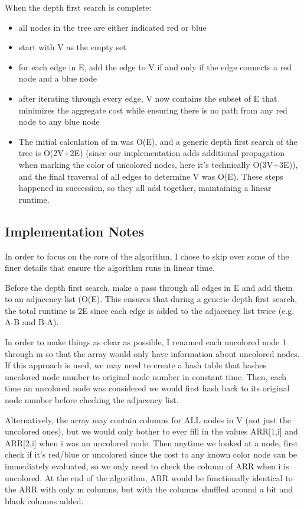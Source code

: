 \documentclass[a4paper]{article}
\begin{document}
When the depth first search is complete:
        
\begin{itemize}
    \item all nodes in the tree are either indicated red or blue
    \item start with V as the empty set
    \item for each edge in E, add the edge to V if and only if the edge connects a red node and a blue node
    \item after iterating through every edge, V now contains the subset of E that minimizes the aggregate cost while ensuring there is no path from any red node to any blue node
    \item The initial calculation of m was O(E), and a generic depth first search of the tree is O(2V+2E) (since our implementation adds additional propagation when marking the color of uncolored nodes, here it's technically O(3V+3E)), and the final traversal of all edges to determine V was O(E). These steps happened in succession, so they all add together, maintaining a linear runtime.
\end{itemize}

\subsection{Implementation Notes}
In order to focus on the core of the algorithm, I chose to skip over some of the finer details that ensure the algorithm runs in linear time.

Before the depth first search, make a pass through all edges in E and add them to an adjacency list (O(E). This ensures that during a generic depth first search, the total runtime is 2E since each edge is added to the adjacency list twice (e.g. A-B and B-A).

In order to make things as clear as possible, I renamed each uncolored node 1 through m so that the array would only have information about uncolored nodes. If this approach is used, we may need to create a hash table that hashes uncolored node number to original node number in constant time. Then, each time an uncolored node was considered we would first hash back to its original node number before checking the adjacency list.

Alternatively, the array may contain columns for ALL nodes in V (not just the uncolored ones), but we would only bother to ever fill in the values ARR[1,i] and ARR[2,i] when i was an uncolored node. Then anytime we looked at a node, first check if it's red/blue or uncolored since the cost to any known color node can be immediately evaluated, so we only need to check the column of ARR when i is uncolored. At the end of the algorithm, ARR would be functionally identical to the ARR with only m columns, but with the columns shuffled around a bit and blank columns added.
\end{document}
